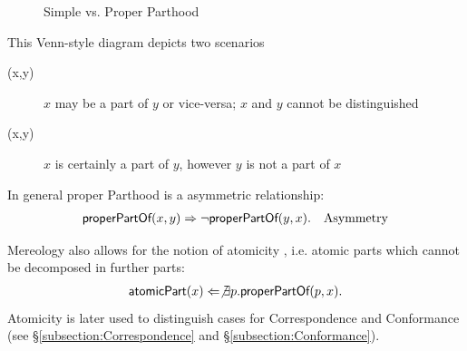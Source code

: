 \begin{figure}[h!]
\begin{center}
\end{center}
\caption{Simple vs. Proper Parthood}
\label{figure:SchematicProperPart}
\end{figure}
This Venn-style diagram depicts two scenarios
\begin{description}
\item[\partOf(x,y)]
$x$ may be a part of $y$ or vice-versa;
$x$ and $y$ cannot be distinguished
\item[\properPartOf(x,y)] 
$x$ is certainly a part of $y$, however $y$ is not a part of $x$
\end{description} 
In general proper \gls{Parthood} is a asymmetric relationship:
\begin{align*}
&\textsf{properPartOf}(x,y) 
\Rightarrow
\neg \textsf{properPartOf}(y,x).
&\text{Asymmetry}
\end{align*}

\Gls{Mereology} also allows for the notion of atomicity \cite{DBLP:journals/dke/Varzi96} \cite{SEP:Mereology}, i.e. atomic parts which cannot be decomposed in further parts:
\begin{align*}
\textsf{atomicPart}(x)
\Leftarrow
\not \exists p.\textsf{properPartOf}(p,x).
\end{align*}
Atomicity is later used to distinguish cases for \gls{Correspondence} and \gls{Conformance} (see §\ref{subsection:Correspondence} and §\ref{subsection:Conformance}).


